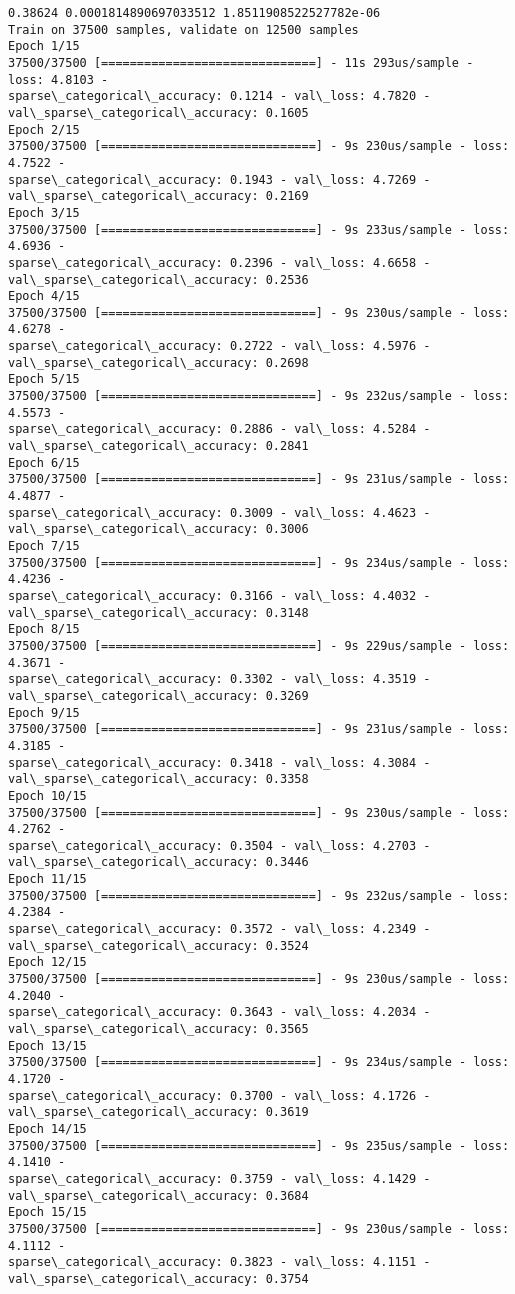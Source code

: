 \documentclass[11pt]{article}
\begin{document}
    \begin{Verbatim}[commandchars=\\\{\}]
0.38624 0.0001814890697033512 1.8511908522527782e-06
Train on 37500 samples, validate on 12500 samples
Epoch 1/15
37500/37500 [==============================] - 11s 293us/sample - loss: 4.8103 -
sparse\_categorical\_accuracy: 0.1214 - val\_loss: 4.7820 -
val\_sparse\_categorical\_accuracy: 0.1605
Epoch 2/15
37500/37500 [==============================] - 9s 230us/sample - loss: 4.7522 -
sparse\_categorical\_accuracy: 0.1943 - val\_loss: 4.7269 -
val\_sparse\_categorical\_accuracy: 0.2169
Epoch 3/15
37500/37500 [==============================] - 9s 233us/sample - loss: 4.6936 -
sparse\_categorical\_accuracy: 0.2396 - val\_loss: 4.6658 -
val\_sparse\_categorical\_accuracy: 0.2536
Epoch 4/15
37500/37500 [==============================] - 9s 230us/sample - loss: 4.6278 -
sparse\_categorical\_accuracy: 0.2722 - val\_loss: 4.5976 -
val\_sparse\_categorical\_accuracy: 0.2698
Epoch 5/15
37500/37500 [==============================] - 9s 232us/sample - loss: 4.5573 -
sparse\_categorical\_accuracy: 0.2886 - val\_loss: 4.5284 -
val\_sparse\_categorical\_accuracy: 0.2841
Epoch 6/15
37500/37500 [==============================] - 9s 231us/sample - loss: 4.4877 -
sparse\_categorical\_accuracy: 0.3009 - val\_loss: 4.4623 -
val\_sparse\_categorical\_accuracy: 0.3006
Epoch 7/15
37500/37500 [==============================] - 9s 234us/sample - loss: 4.4236 -
sparse\_categorical\_accuracy: 0.3166 - val\_loss: 4.4032 -
val\_sparse\_categorical\_accuracy: 0.3148
Epoch 8/15
37500/37500 [==============================] - 9s 229us/sample - loss: 4.3671 -
sparse\_categorical\_accuracy: 0.3302 - val\_loss: 4.3519 -
val\_sparse\_categorical\_accuracy: 0.3269
Epoch 9/15
37500/37500 [==============================] - 9s 231us/sample - loss: 4.3185 -
sparse\_categorical\_accuracy: 0.3418 - val\_loss: 4.3084 -
val\_sparse\_categorical\_accuracy: 0.3358
Epoch 10/15
37500/37500 [==============================] - 9s 230us/sample - loss: 4.2762 -
sparse\_categorical\_accuracy: 0.3504 - val\_loss: 4.2703 -
val\_sparse\_categorical\_accuracy: 0.3446
Epoch 11/15
37500/37500 [==============================] - 9s 232us/sample - loss: 4.2384 -
sparse\_categorical\_accuracy: 0.3572 - val\_loss: 4.2349 -
val\_sparse\_categorical\_accuracy: 0.3524
Epoch 12/15
37500/37500 [==============================] - 9s 230us/sample - loss: 4.2040 -
sparse\_categorical\_accuracy: 0.3643 - val\_loss: 4.2034 -
val\_sparse\_categorical\_accuracy: 0.3565
Epoch 13/15
37500/37500 [==============================] - 9s 234us/sample - loss: 4.1720 -
sparse\_categorical\_accuracy: 0.3700 - val\_loss: 4.1726 -
val\_sparse\_categorical\_accuracy: 0.3619
Epoch 14/15
37500/37500 [==============================] - 9s 235us/sample - loss: 4.1410 -
sparse\_categorical\_accuracy: 0.3759 - val\_loss: 4.1429 -
val\_sparse\_categorical\_accuracy: 0.3684
Epoch 15/15
37500/37500 [==============================] - 9s 230us/sample - loss: 4.1112 -
sparse\_categorical\_accuracy: 0.3823 - val\_loss: 4.1151 -
val\_sparse\_categorical\_accuracy: 0.3754
    \end{Verbatim}
\end{document}

